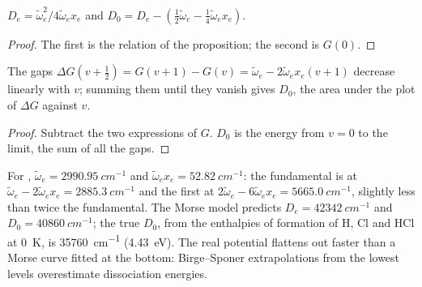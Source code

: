 \begin{corollary}\label{cor:b3:rovibrational-spectroscopy:de}
$D_e = \tilde\omega_e^2/4\tilde\omega_ex_e$ and $D_0 = D_e - (\frac12\tilde\omega_e -
\frac14\tilde\omega_ex_e)$.
\end{corollary}

\begin{proof}
The first is the relation of the proposition; the second is $G(0)$.
\end{proof}

\begin{proposition}\label{prop:b3:rovibrational-spectroscopy:birge-sponer}
The gaps $\Delta G(v + \frac12) = G(v+1) - G(v) = \tilde\omega_e - 2\tilde\omega_ex_e(v +
1)$ decrease linearly with $v$; summing them until they vanish gives $D_0$, the
area under the plot of $\Delta G$ against $v$.
\end{proposition}

\begin{proof}
Subtract the two expressions of $G$. $D_0$ is the energy from $v = 0$ to the
limit, the sum of all the gaps.
\end{proof}

\begin{example}\label{ex:b3:rovibrational-spectroscopy:hcl}
For , $\tilde\omega_e = \qty{2990.95}{cm^{-1}}$ and $\tilde\omega_ex_e =
\qty{52.82}{cm^{-1}}$: the fundamental is at $\tilde\omega_e - 2\tilde\omega_ex_e =
\qty{2885.3}{cm^{-1}}$ and the first  at $2\tilde\omega_e - 6\tilde\omega_ex_e =
\qty{5665.0}{cm^{-1}}$, slightly less than twice the fundamental. The Morse model
predicts $D_e = \qty{42342}{cm^{-1}}$ and $D_0 = \qty{40860}{cm^{-1}}$; the true $D_0$,
from the enthalpies of formation of H, Cl and HCl at \qty{0}{K}, is
\qty{35760}{cm^{-1}} (\qty{4.43}{eV}). The real potential flattens out faster than a
Morse curve fitted at the bottom: Birge--Sponer extrapolations from the
lowest levels overestimate dissociation energies.
\end{example}

